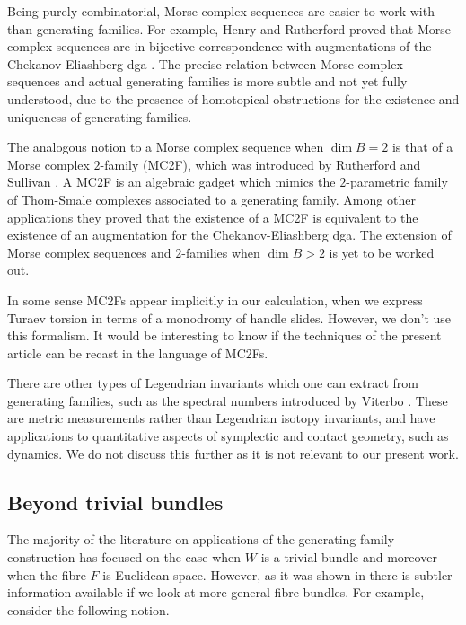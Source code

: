 Being purely combinatorial, Morse complex sequences are easier to work with than generating families. For example, Henry and Rutherford proved that Morse complex sequences are in bijective correspondence with augmentations of the Chekanov-Eliashberg dga \cite{HR15}. The precise relation between Morse complex sequences and actual generating families is more subtle and not yet fully understood, due to the presence of homotopical obstructions for the existence and uniqueness of generating families.

The analogous notion to a Morse complex sequence when $\dim B =2$ is that of a Morse complex $2$-family (MC2F), which was introduced by Rutherford and Sullivan \cite{RS18}. A MC2F is an algebraic gadget which mimics the $2$-parametric family of Thom-Smale complexes associated to a generating family. Among other applications they proved that the existence of a MC2F is equivalent to the existence of an augmentation for the Chekanov-Eliashberg dga. The extension of Morse complex sequences and $2$-families when $\dim B >2$ is yet to be worked out.

\begin{remark} In some sense MC2Fs appear implicitly in our calculation, when we express Turaev torsion in terms of a monodromy of handle slides. However, we don't use this formalism. It would be interesting to know if the techniques of the present article can be recast in the language of MC2Fs.
\end{remark}

There are other types of Legendrian invariants which one can extract from generating families, such as the spectral numbers introduced by Viterbo \cite{V92}. These are metric measurements rather than Legendrian isotopy invariants, and have applications to quantitative aspects of symplectic and contact geometry, such as dynamics. We do not discuss this further as it is not relevant to our present work.

\subsection{Beyond trivial bundles}

The majority of the literature on applications of the generating family construction has focused on the case when $W$ is a trivial bundle and moreover when the fibre $F$ is Euclidean space. However, as it was shown in \cite{EG98} there is subtler information available if we look at more general fibre bundles. For example, consider the following notion.

